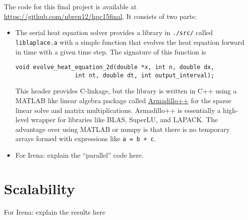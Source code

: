 \documentclass{article}
\begin{document}
The code for this final project is available at \url{https://github.com/nbren12/hpc15final}.
It consists of two parts:
\begin{itemize}
\item The serial heat equation solver provides a library in
  \verb|./src/| called \verb|liblaplace.a| with a simple function that
  evolves the heat equation forward in time with a given time
  step. The signature of this function is
\begin{lstlisting}
void evolve_heat_equation_2d(double *x, int n, double dx,
			     int nt, double dt, int output_interval);
\end{lstlisting}
  
This header provides C-linkage, but the library is written in C++
using a MATLAB like linear algebra package called
\href{http://arma.sourceforge.net/}{Armadillo++} for the sparse linear
solve and matrix multiplications. Armadillo++ is essentially a
high-level wrapper for libraries like BLAS, SuperLU, and LAPACK. The
advantage over using MATLAB or numpy is that there is no temporary
arrays formed with expressions like \verb|a = b + c|.

\item For Irena: explain the ``parallel'' code here.

\end{itemize}

\section{Scalability}
\label{sec:scale}

For Irena: explain the results here




\end{document}
